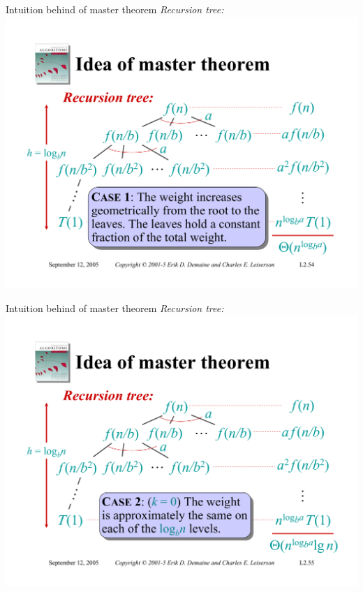 \documentclass{beamer}
\begin{document}
\begin{frame}{Intuition behind of master theorem}
    \textit{Recursion tree:}\\
    \vspace{5mm}
    \includegraphics[width=\textwidth, trim={1.10cm 1.20cm 0.30cm 5.50cm}, clip]{pages/lec2_54}
\end{frame}
\begin{frame}{Intuition behind of master theorem}
    \textit{Recursion tree:}\\
    \vspace{5mm}
    \includegraphics[width=\textwidth, trim={1.10cm 1.20cm 0.30cm 5.50cm}, clip]{pages/lec2_55}
\end{frame}
\end{document}
